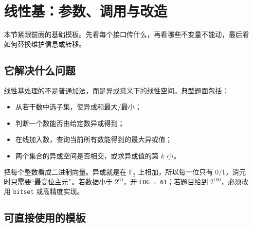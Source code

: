 \section{线性基：参数、调用与改造}

本节紧跟前面的基础模板。先看每个接口传什么，再看哪些不变量不能动，最后看如何替换维护信息或转移。

\subsection{它解决什么问题}

线性基处理的不是普通加法，而是异或意义下的线性空间。典型题面包括：

\begin{itemize}
\tightlist
\item
  从若干数中选子集，使异或和最大/最小；
\item
  判断一个数能否由给定数异或得到；
\item
  在线加入数，查询当前所有数能得到的最大异或值；
\item
  两个集合的异或空间是否相交，或求异或值的第 \(k\) 小。
\end{itemize}

把每个整数看成二进制向量。异或就是在 \(\mathbb F_2\) 上相加，所以每一位只有 \(0/1\)，消元时只需要``最高位主元''。若数据小于 \(2^{60}\)，开 \passthrough{\lstinline!LOG = 61!}；若题目给到 \(2^{100}\)，必须改用 \passthrough{\lstinline!bitset!} 或高精度实现。


\subsection{可直接使用的模板}

